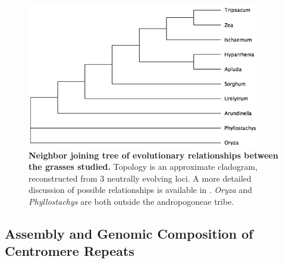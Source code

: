 \documentclass[10pt,letterpaper]{article}
\newcommand{\jri}[1]{\todo[size=\scriptsize, color=SkyBlue]{#1}}
\newcommand{\pb}[1]{\todo[size=\scriptsize, color=Bittersweet]{#1}} %
\begin{document}
\begin{figure}[h]
\begin{center}
\includegraphics[width=4in]{Phylotree_centrepeat.png}
\end{center}
\caption{{\bf Neighbor joining tree of evolutionary relationships between the grasses studied.}
Topology is an approximate cladogram, reconstructed from 3 neutrally evolving loci.
A more detailed discussion of possible relationships is available in \cite{wu2012phylogeny,skendzic2007phylogenetics}.  
\emph{Oryza} and \emph{Phyllostachys} are both outside the andropogoneae tribe.}
\label{phylotree}
\end{figure}
\subsection*{Assembly and Genomic Composition of Centromere Repeats}

\end{document}
